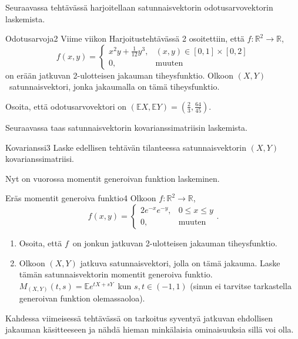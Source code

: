 \documentclass[11pt,a4paper]{amsart}
\newcommand{\R}{\mathbb{R}}
\newcommand{\E}{\mathbb{E}}
\newcommand{\1}{\mathbf{1}}
\begin{document}
Seuraavassa tehtävässä harjoitellaan satunnaisvektorin odotusarvovektorin laskemista.

\begin{Exercises}{Odotusarvoja}{2}
Viime viikon Harjoitustehtävässä 2 osoitettiin, että $f:\R^2\to \R$, 
\[
f(x,y)=\begin{cases}
x^2 y+\frac{1}{12}y^3, & (x,y)\in [0,1]\times [0,2]\\
0, & \text{muuten}
\end{cases}
\]
on erään jatkuvan 2-ulotteisen jakauman tiheysfunktio. Olkoon $(X,Y)$ satunnaisvektori, jonka jakaumalla on tämä tiheysfunktio. 

\medskip

Osoita, että odotusarvovektori on $(\E X,\E Y)=(\frac{2}{3},\frac{64}{45})$. 

\end{Exercises}

Seuraavassa taas satunnaisvektorin kovarianssimatriisin laskemista.

\begin{Exercises}{Kovarianssi}{3}
Laske edellisen tehtävän tilanteessa satunnaisvektorin $(X,Y)$ kovarianssimatriisi.


\end{Exercises}


Nyt on vuorossa momentit generoivan funktion laskeminen.

\begin{Exercises}{Eräs momentit generoiva funktio}{4}
Olkoon $f:\R^2\to \R$, 
\[
f(x,y)=\begin{cases}
2 e^{-x}e^{-y}, & 0\leq x\leq y\\
0, & \text{muuten}
\end{cases}.
\]
\begin{enumerate}
\item Osoita, että $f$ on jonkun jatkuvan 2-ulotteisen jakauman tiheysfunktio. 


\item Olkoon $(X,Y)$ jatkuva satunnaisvektori, jolla on tämä jakauma. Laske tämän satunnaisvektorin momentit generoiva funktio. $M_{(X,Y)}(t,s)=\E e^{tX+sY}$ kun $s,t\in(-1,1)$ (sinun ei tarvitse tarkastella generoivan funktion olemassaoloa).


\end{enumerate}
\end{Exercises}


Kahdessa viimeisessä tehtävässä on tarkoitus syventyä jatkuvan ehdollisen jakauman käsitteeseen ja nähdä hieman minkälaisia ominaisuuksia sillä voi olla. 
\end{document}
